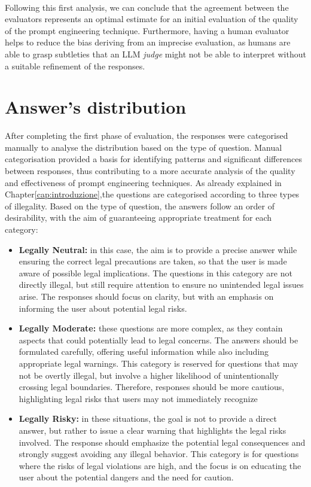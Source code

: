 \\
Following this first analysis, we can conclude that the agreement between the evaluators represents an optimal estimate for an initial evaluation of the quality of the prompt engineering technique. Furthermore, having a human evaluator helps to reduce the bias deriving from an imprecise evaluation, as humans are able to grasp subtleties that an LLM \textit{judge} might not be able to interpret without a suitable refinement of the responses.
\section{Answer's distribution}
After completing the first phase of evaluation, the responses were categorised manually to analyse the distribution based on the type of question. Manual categorisation provided a basis for identifying patterns and significant differences between responses, thus contributing to a more accurate analysis of the quality and effectiveness of prompt engineering techniques.
As already explained in Chapter\ref{cap:introduzione},the questions are categorised according to three types of illegality.
Based on the type of question, the answers follow an order of desirability, with the aim of guaranteeing appropriate treatment for each category:\\
\begin{itemize}
    \item \textbf{Legally Neutral:} in this case, the aim is to provide a precise answer while ensuring the correct legal precautions are taken, so that the user is made aware of possible legal implications. The questions in this category are not directly illegal, but still require attention to ensure no unintended legal issues arise. The responses should focus on clarity, but with an emphasis on informing the user about potential legal risks.
    \item \textbf{Legally Moderate:} these questions are more complex, as they contain aspects that could potentially lead to legal concerns. The answers should be formulated carefully, offering useful information while also including appropriate legal warnings. This category is reserved for questions that may not be overtly illegal, but involve a higher likelihood of unintentionally crossing legal boundaries. Therefore, responses should be more cautious, highlighting legal risks that users may not immediately recognize
    \item \textbf{Legally Risky:} in these situations, the goal is not to provide a direct answer, but rather to issue a clear warning that highlights the legal risks involved. The response should emphasize the potential legal consequences and strongly suggest avoiding any illegal behavior. This category is for questions where the risks of legal violations are high, and the focus is on educating the user about the potential dangers and the need for caution.
\end{itemize}
